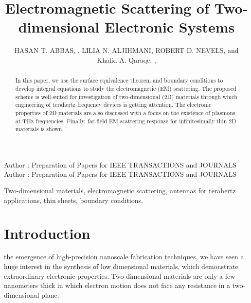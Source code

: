 \documentclass{ieeeaccess}
\renewcommand{\^}{\hat}  %
\begin{document}

\title{Electromagnetic Scattering of Two-dimensional Electronic Systems}
\author{\uppercase{Hasan T. Abbas}, ,
\uppercase{Lilia N. Aljihmani},
\uppercase{Robert D. Nevels},
and Khalid A. Qaraqe,
,
}
\address[1]{James Watt School of Engineering, University of Glasgow, G12 8QQ UK}
\address[2]{Department of Electrical \& Computer Engineering, Texas A\&M University at Qatar, Doha, 
23874}
\address[3]{Department of Electrical \& Computer Engineering, Texas A\&M University, College Station, TX 77843}
\tfootnote{}

\markboth
{Author \headeretal: Preparation of Papers for IEEE TRANSACTIONS and JOURNALS}
{Author \headeretal: Preparation of Papers for IEEE TRANSACTIONS and JOURNALS}


\begin{abstract}
In this paper, we use the surface equivalence theorem and boundary conditions to develop integral equations to study the electromagnetic (EM) scattering. The proposed scheme is well-suited for investigation of two-dimensional (2D) materials through which engineering of terahertz frequency devices is getting attention. The electronic properties of 2D materials are also discussed with a focus on the existence of plasmons at THz frequencies. Finally, far-field EM scattering response for infinitesimally thin 2D materials is shown.
\end{abstract}

\begin{keywords}
Two-dimensional materials, electromagnetic scattering, antennas for terahertz applications, thin sheets, boundary conditions.
\end{keywords}

\titlepgskip=-15pt

\maketitle

\section{Introduction}
\label{sec:introduction}
 the emergence of high-precision nanoscale fabrication techniques, we have seen a huge interest in the synthesis of low dimensional materials, which demonstrate extraordinary electronic properties. Two-dimensional materials are only a few nanometers thick in which electron motion does not face any resistance in a two-dimensional plane. 
\end{document}
